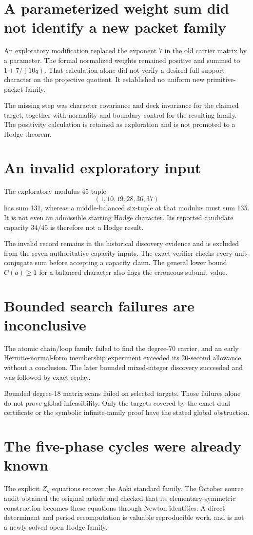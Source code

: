 \section{A parameterized weight sum did not identify a new packet family}
An exploratory modification replaced the exponent 7 in the old carrier matrix by a parameter. The formal normalized weights remained positive and summed to $1+7/(10q)$. That calculation alone did not verify a desired full-support character on the projective quotient. It established no uniform new primitive-packet family.

The missing step was character covariance and deck invariance for the claimed target, together with normality and boundary control for the resulting family. The positivity calculation is retained as exploration and is not promoted to a Hodge theorem.

\section{An invalid exploratory input}
The exploratory modulus-45 tuple
\[
(1,10,19,28,36,37)
\]
has sum 131, whereas a middle-balanced six-tuple at that modulus must sum 135. It is not even an admissible starting Hodge character. Its reported candidate capacity $34/45$ is therefore not a Hodge result.

The invalid record remains in the historical discovery evidence and is excluded from the seven authoritative capacity inputs. The exact verifier checks every unit-conjugate sum before accepting a capacity claim. The general lower bound $C(a)\ge1$ for a balanced character also flags the erroneous subunit value.

\section{Bounded search failures are inconclusive}
The atomic chain/loop family failed to find the degree-70 carrier, and an early Hermite-normal-form membership experiment exceeded its 20-second allowance without a conclusion. The later bounded mixed-integer discovery succeeded and was followed by exact replay.

Bounded degree-18 matrix scans failed on selected targets. Those failures alone do not prove global infeasibility. Only the targets covered by the exact dual certificate or the symbolic infinite-family proof have the stated global obstruction.

\section{The five-phase cycles were already known}
The explicit $Z_\kappa$ equations recover the Aoki standard family. The October source audit obtained the original article and checked that its elementary-symmetric construction becomes these equations through Newton identities. A direct determinant and period recomputation is valuable reproducible work, and is not a newly solved open Hodge family.

